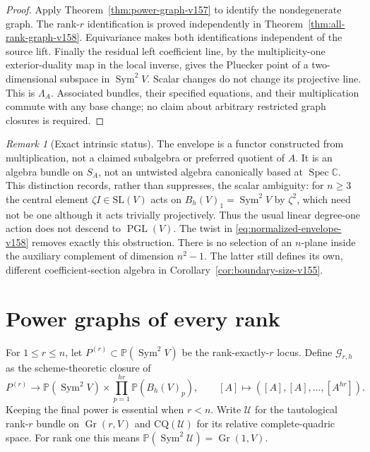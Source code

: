 \documentclass[11pt,reqno]{amsart}
\numberwithin{equation}{section}
\theoremstyle{definition}\newtheorem{definition}[theorem]{Definition}
\theoremstyle{remark}\newtheorem{remark}[theorem]{Remark}
\newcommand{\C}{\mathbb C}\newcommand{\Q}{\mathbb Q}
\newcommand{\Pj}{\mathbb P}\newcommand{\A}{\mathbb A}
\DeclareMathOperator{\Sym}{Sym}\DeclareMathOperator{\Gr}{Gr}
\DeclareMathOperator{\Spec}{Spec}\DeclareMathOperator{\PGL}{PGL}
\begin{document}
\begin{proof}
Apply Theorem~\ref{thm:power-graph-v157} to identify the nondegenerate
graph. The rank-$r$ identification is proved independently in
Theorem~\ref{thm:all-rank-graph-v158}. Equivariance makes both
identifications independent of the source lift. Finally the residual
left coefficient line, by the multiplicity-one exterior-duality map
in the local inverse, gives the Pluecker point of a two-dimensional
subspace in $\Sym^2V$. Scalar changes do not change its projective
line. This is $\Lambda_A$. Associated bundles, their specified
equations, and their multiplication commute with any base change;
no claim about arbitrary restricted graph closures is required.
\end{proof}

\begin{remark}[Exact intrinsic status]
\label{rem:envelope-status-v158}
The envelope is a functor constructed from multiplication, not a claimed
subalgebra or preferred quotient of $A$. It is an algebra bundle on
$S_A$, not an untwisted algebra canonically based at $\Spec\C$.
This distinction records, rather than suppresses, the scalar ambiguity:
for $n\geq3$ the central element $\zeta I\in\mathrm{SL}(V)$ acts on
$B_h(V)_1=\Sym^2V$ by $\zeta^2$, which need not be one although it
acts trivially projectively. Thus the usual linear degree-one action
does not descend to $\PGL(V)$. The twist in
\eqref{eq:normalized-envelope-v158} removes exactly this obstruction.
There is no selection of an $n$-plane inside the auxiliary complement
of dimension $n^2-1$. The latter still defines its own, different
coefficient-section algebra in Corollary~\ref{cor:boundary-size-v155}.
\end{remark}

\section{Power graphs of every rank}
\label{sec:all-rank-graph-v158}
For $1\leq r\leq n$, let $P^{(r)}\subset\Pj(\Sym^2V)$ be the
rank-exactly-$r$ locus. Define $\mathcal G_{r,h}$ as the
scheme-theoretic closure of
\begin{equation}\label{eq:rank-graph-definition-v158}
 P^{(r)}\longrightarrow
 \Pj(\Sym^2V)\times\prod_{p=1}^{hr}\Pj(B_h(V)_p),
 \qquad[A]\longmapsto([A],[A],\ldots,[A^{hr}]).
\end{equation}
Keeping the final power is essential when $r<n$. Write $\mathcal U$
for the tautological rank-$r$ bundle on $\Gr(r,V)$ and
$\mathrm{CQ}(\mathcal U)$ for its relative complete-quadric space.
For rank one this means $\Pj(\Sym^2\mathcal U)=\Gr(1,V)$.
\end{document}
